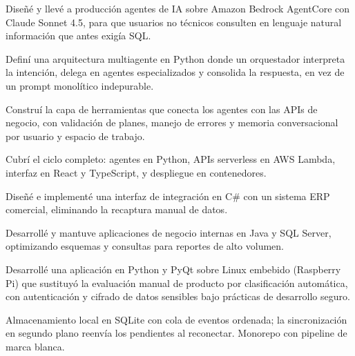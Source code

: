 \documentclass{atscv}
\begin{document}
\begin{cvbullets}
  \item Diseñé y llevé a producción agentes de IA sobre Amazon Bedrock
        AgentCore con Claude Sonnet 4.5, para que usuarios no técnicos
        consulten en lenguaje natural información que antes exigía SQL.
  \item Definí una arquitectura multiagente en Python donde un orquestador
        interpreta la intención, delega en agentes especializados y consolida
        la respuesta, en vez de un prompt monolítico indepurable.
  \item Construí la capa de herramientas que conecta los agentes con las APIs
        de negocio, con validación de planes, manejo de errores y memoria
        conversacional por usuario y espacio de trabajo.
  \item Cubrí el ciclo completo: agentes en Python, APIs serverless en AWS
        Lambda, interfaz en React y TypeScript, y despliegue en contenedores.
\end{cvbullets}

\begin{cvbullets}
  \item Diseñé e implementé una interfaz de integración en C\# con un sistema
        ERP comercial, eliminando la recaptura manual de datos.
  \item Desarrollé y mantuve aplicaciones de negocio internas en Java y SQL
        Server, optimizando esquemas y consultas para reportes de alto volumen.
\end{cvbullets}

\begin{cvbullets}
  \item Desarrollé una aplicación en Python y PyQt sobre Linux embebido
        (Raspberry Pi) que sustituyó la evaluación manual de producto por
        clasificación automática, con autenticación y cifrado de datos
        sensibles bajo prácticas de desarrollo seguro.
\end{cvbullets}


\begin{cvbullets}
  \item Almacenamiento local en SQLite con cola de eventos ordenada; la
        sincronización en segundo plano reenvía los pendientes al reconectar.
        Monorepo con pipeline de marca blanca.
\end{cvbullets}
\end{document}
